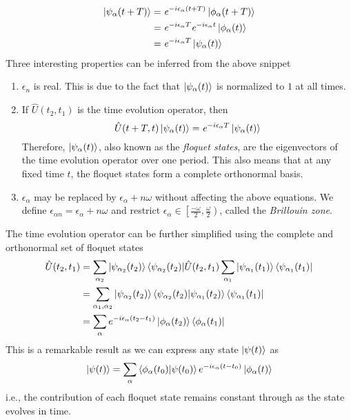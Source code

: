 \begin{align*}
  \ket{\psi_{\alpha}(t+T)} &= \mathit{e}^{-i \epsilon_{\alpha} (t+T)} \ket{\phi_{\alpha}(t+T)} \\
  &= \mathit{e}^{-i \epsilon_{\alpha} T} \mathit{e}^{-i \epsilon_{\alpha} t} \ket{\phi_{\alpha}(t)} \\  
  &= \mathit{e}^{-i \epsilon_{\alpha} T} \ket{\psi_{\alpha}(t)}
\end{align*}
Three interesting properties can be inferred from the above snippet
\begin{enumerate}
 \item $\epsilon_n$ is real. This is due to the fact that $\ket{\psi_{\alpha}(t)}$ is normalized to $1$ at all times.
 \item If $\hat{U}(t_2, t_1)$ is the time evolution operator, then 
 \begin{equation}
  \label{chap_5:stateseigstrobo}\hat{U}(t + T, t)\ket{\psi_{\alpha}(t)} = \mathit{e}^{-i \epsilon_{\alpha} T} \ket{\psi_{\alpha}(t)}
 \end{equation} Therefore, $\ket{\psi_{\alpha}(t)}$, also known as the \emph{floquet states}, are the eigenvectors of the time evolution operator over one period. 
 This also means that at any fixed time $t$, the floquet states form a complete orthonormal basis.
 \item $\epsilon_\alpha$ may be replaced by $\epsilon_\alpha + n\omega$ without affecting the above equations. We define $\epsilon_{\alpha n} = \epsilon_\alpha + n\omega$ and 
 restrict $\epsilon_\alpha \in \left[\frac{-\omega}{2}, \frac{\omega}{2}\right)$, called the \emph{Brillouin zone}.
\end{enumerate}

The time evolution operator can be further simplified using the complete and orthonormal set of floquet states
\begin{align}
  \hat{U}(t_2, t_1) &= \sum_{\alpha_2}{\ket{\psi_{\alpha_2}(t_2)}\bra{\psi_{\alpha_2}(t_2)}}\hat{U}(t_2, t_1)\sum_{\alpha_1}{\ket{\psi_{\alpha_1}(t_1)}\bra{\psi_{\alpha_1}(t_1)}} \nonumber \\
  &= \sum_{\alpha_1, \alpha_2}{\ket{\psi_{\alpha_2}(t_2)}\braket{\psi_{\alpha_2}(t_2)|\psi_{\alpha_1}(t_2)}\bra{\psi_{\alpha_1}(t_1)}} \nonumber \\
  \label{chap_5:timeevol} &= \sum_{\alpha}{e^{-i\epsilon_\alpha (t_2 - t_1)} \ket{\phi_\alpha (t_2)}\bra{\phi_\alpha (t_1)}}
\end{align} This is a remarkable result as we can express any state $\ket{\psi(t)}$ as
\begin{equation}
  \ket{\psi(t)} = \sum_{\alpha}{\braket{\phi_\alpha (t_0) | \psi(t_0)} e^{-i\epsilon_\alpha (t - t_0)} \ket{\phi_\alpha (t)}} 
\end{equation} i.e., the contribution of each floquet state remains constant through as the state evolves in time.


